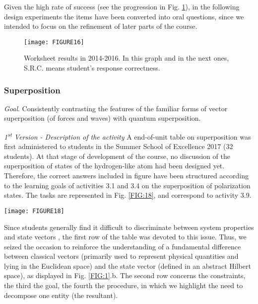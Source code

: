 \documentclass[twocolumn,secnumarabic,amssymb, nobibnotes, aps, prd, nofootinbib]{revtex4-2}
\begin{document}
Given the high rate of success (see the progression in Fig. \ref{FIG:16}), in the following design experiments the items have been converted into oral questions, since we intended to focus on the refinement of later parts of the course.
\begin{figure}[!htpb]
       \texttt{[image: FIGURE16]}
    \caption{Worksheet results in 2014-2016. In this graph and in the next ones, S.R.C. means student's response correctness.}
    \label{FIG:16}
\end{figure}

\subsubsection{Superposition} \label{Sec:5.2.2}
\emph{Goal}.  Consistently contrasting the features of the familiar forms of vector superposition (of forces and waves) with quantum superposition.

\emph{1\textsuperscript{st} Version - Description of the activity} A end-of-unit table on superposition was first administered to students in the Summer School of Excellence 2017 (32 students). At that stage of development of the course, no discussion of the superposition of states of the hydrogen-like atom had been designed yet. Therefore, the correct answers included in figure have been structured according to the learning goals of activities 3.1 and 3.4 on the superposition of polarization states. The tasks are represented in Fig. \ref{FIG:18}, and correspond to activity 3.9.
\begin{figure*}[!htpb]
       \texttt{[image: FIGURE18]}
    \caption{End-of-unit table on superposition filled with correct answers: 2017 version.}
    \label{FIG:18}
\end{figure*}
Since students generally find it difficult to discriminate between system properties and state vectors \cite{Pospiech2021}, the first row of the table was devoted to this issue. Thus, we seized the occasion to reinforce the understanding of a fundamental difference between classical vectors (primarily used to represent physical quantities and lying in the Euclidean space) and the state vector (defined in an abstract Hilbert space), as displayed in Fig. \ref{FIG:1}.b. The second row concerns the constraints, the third the goal, the fourth the procedure, in which we highlight the need to decompose one entity (the resultant).
\end{document}
